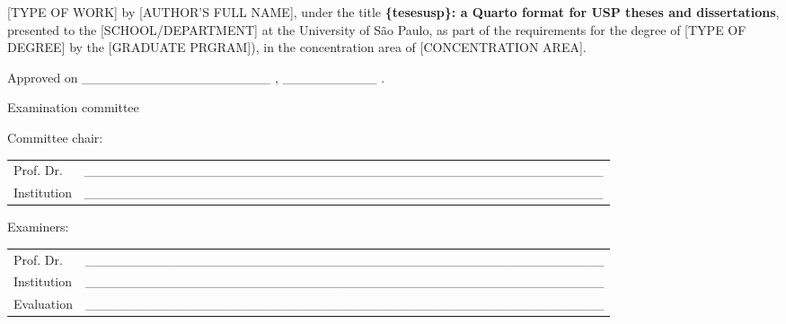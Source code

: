 \begin{folhadeaprovacao}
  \noindent
{[}TYPE OF WORK{]} by {[}AUTHOR'S FULL NAME{]}, under the title
\textbf{\{tesesusp\}: a Quarto format for USP theses and dissertations},
presented to the {[}SCHOOL/DEPARTMENT{]} at the University of São Paulo,
as part of the requirements for the degree of {[}TYPE OF DEGREE{]} by
the {[}GRADUATE PRGRAM{]}), in the concentration area of
{[}CONCENTRATION AREA{]}.

  \vspace*{1.5cm}

  \noindent
  Approved on \_\_\_\_\_\_\_\_\_\_\_\_\_\_\_\_\_\_\_\_ , \_\_\_\_\_\_\_\_\_\_ .

  \vspace*{1.5cm}

  \begin{center}
    \noindent Examination committee
  \end{center}

  \vspace*{0.5cm}

  \noindent Committee chair:

  \vspace*{0.25cm}

  \renewcommand{\arraystretch}{2}
  \setlength{\arrayrulewidth}{0pt}
  \setlength{\tabcolsep}{0pt}
  \noindent
  \begin{tabular}{m{2cm} P{14cm}}
    Prof. Dr. & \_\_\_\_\_\_\_\_\_\_\_\_\_\_\_\_\_\_\_\_\_\_\_\_\_\_\_\_\_\_\_\_\_\_\_\_\_\_\_\_\_\_\_\_\_\_\_\_\_\_\_\_\_\_\_ \\
    Institution & \_\_\_\_\_\_\_\_\_\_\_\_\_\_\_\_\_\_\_\_\_\_\_\_\_\_\_\_\_\_\_\_\_\_\_\_\_\_\_\_\_\_\_\_\_\_\_\_\_\_\_\_\_\_\_ \\
  \end{tabular}

  \vspace*{1cm}

  \noindent Examiners:

  \vspace*{0.25cm}

  \noindent
  \begin{tabular}{m{2cm} P{14cm}}
    Prof. Dr. & \_\_\_\_\_\_\_\_\_\_\_\_\_\_\_\_\_\_\_\_\_\_\_\_\_\_\_\_\_\_\_\_\_\_\_\_\_\_\_\_\_\_\_\_\_\_\_\_\_\_\_\_\_\_\_ \\
    Institution & \_\_\_\_\_\_\_\_\_\_\_\_\_\_\_\_\_\_\_\_\_\_\_\_\_\_\_\_\_\_\_\_\_\_\_\_\_\_\_\_\_\_\_\_\_\_\_\_\_\_\_\_\_\_\_ \\
    Evaluation & \_\_\_\_\_\_\_\_\_\_\_\_\_\_\_\_\_\_\_\_\_\_\_\_\_\_\_\_\_\_\_\_\_\_\_\_\_\_\_\_\_\_\_\_\_\_\_\_\_\_\_\_\_\_\_ \\
  \end{tabular}


\end{folhadeaprovacao}

